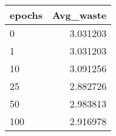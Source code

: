 \begin{tabular}{lr}
\toprule
epochs &  Avg\_waste \\
\midrule
     0 &   3.031203 \\
     1 &   3.031203 \\
    10 &   3.091256 \\
    25 &   2.882726 \\
    50 &   2.983813 \\
   100 &   2.916978 \\
\bottomrule
\end{tabular}
